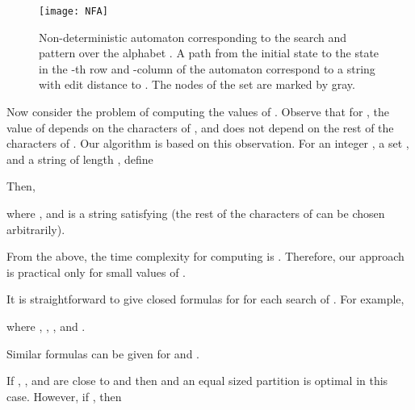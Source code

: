 \documentclass[12pt]{article}
\newif\iffull
\newif\ifextra
\begin{document}
\begin{figure}
\centering
\texttt{[image: NFA]}
\caption{Non-deterministic automaton corresponding
to the search  and pattern  over the alphabet
.
A path from the initial state  to the state in the -th row and
-column of the automaton correspond to a string with edit distance
 to .
The nodes of the set  are marked by gray.\label{fig:NFA}}
\end{figure}

Now consider the problem of computing the values of .
Observe that for , the value of
 depends on the characters of ,
and does not depend on the rest of the characters of .
Our algorithm is based on this observation.
For an integer , a set , and
a string  of length , define

Then,

where , and
 is a string satisfying 
(the rest of the characters of  can be chosen arbitrarily).

From the above, the time complexity for computing
 is
.
Therefore, our approach is practical only for small values of .

\iffull
\subsection{Uneven partitions}\label{sec:uneven}
In Section~\ref{sec:bidirectional}, we provided an informal explanation why
partitioning the pattern into unequal parts may be beneficial. 
We now provide a formal justification for this. 
To this end, we replace (\ref{eq:a2}) by an even simpler estimator of
:


As an example, consider scheme .
Denote by , ,  the lengths of the parts
in a partition  of  into 3 parts.
\ifextra
It is straightforward to give closed form formulas for the values of 
 for the searches of the scheme.
For example, for  we have

(if  then )
and therefore


For the backward search ,

(if  then 
)
and therefore

Therefore
\else
It is straightforward to give closed formulas for  for each search of .
For example,
\fi

where
,
,
, and
.
\ifextra
Similarly,

where
,
,
,
,
,
, and
.
\else
Similar formulas can be given for  and .
\fi
If , , and  are close to  and  then
 and an
equal sized partition is optimal in this case.
However, if , then
\end{document}
